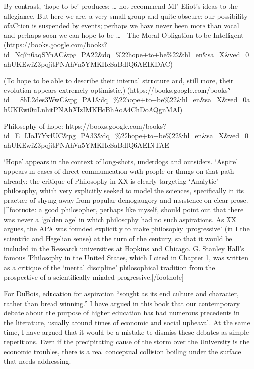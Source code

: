 By contrast, `hope to be' produces:
{\ldots} not recommend Ml'. Eliot's ideas to the allegiance. But here we are, a very small group and quite obscure; our possibility ofaCtion is suspended by events; perhaps we have never been more than vocal and perhaps soon we can hope to be {\ldots} - The Moral Obligation to be Intelligent (https:\slash \slash books.google.com\slash books?id=Nq7n6aqSYnAC\&pg=PA22\&dq=\%22hope+to+be\%22\&hl=en\&sa=X\&ved=0ahUKEwiZ3pqjitPNAhVn5YMKHcSaBdIQ6AEIKDAC)

(To hope to be able to describe their internal structure and, still more, their evolution appears extremely optimistic.) (https:\slash \slash books.google.com\slash books?id=\_8hL2des3WwC\&pg=PA1\&dq=\%22hope+to+be\%22\&hl=en\&sa=X\&ved=0ahUKEwi0uLnhitPNAhXIzIMKHcBhAoA4ChDoAQgnMAI)

Philosophy of hope: https:\slash \slash books.google.com\slash books?id=E\_IJoJ7Yx4UC\&pg=PA33\&dq=\%22hope+to+be\%22\&hl=en\&sa=X\&ved=0ahUKEwiZ3pqjitPNAhVn5YMKHcSaBdIQ6AEINTAE

`Hope' appears in the context of long-shots, underdogs and outsiders. `Aspire' appears in cases of direct communication with people or things on that path already: the critique of Philosophy in XX is clearly targeting `Analytic' philosophy, which very explicitly seeked to model the sciences, specifically in its practice of shying away from popular demogaugory and insistence on clear prose. [\^{}footnote: a good philosopher, perhaps like myself, should point out that there was never a `golden age' in which philosophy had no such aspirations. As XX argues, the APA was founded explicitly to make philosophy `progressive' (in I the scientific and Hegelian sense) at the turn of the century, so that it would be included in the Research universities at Hopkins and Chicago. G. Stanley Hall's famous 'Philosophy in the United States, which I cited in Chapter 1, was written as a critique of the `mental discipline' philosophical tradition from the prospective of a scientifically-minded progressive.[\slash footnote]

For DuBois, education for aspiration ``sought as its end culture and character, rather than bread winning.'' I have argued in this book that our contemporary debate about the purpose of higher education has had numerous precedents in the literature, usually around times of economic and social upheaval. At the same time, I have argued that it would be a mistake to dismiss these debates as simple repetitions. Even if the precipitating cause of the storm over the University is the economic troubles, there is a real conceptual collision boiling under the surface that needs addressing.

